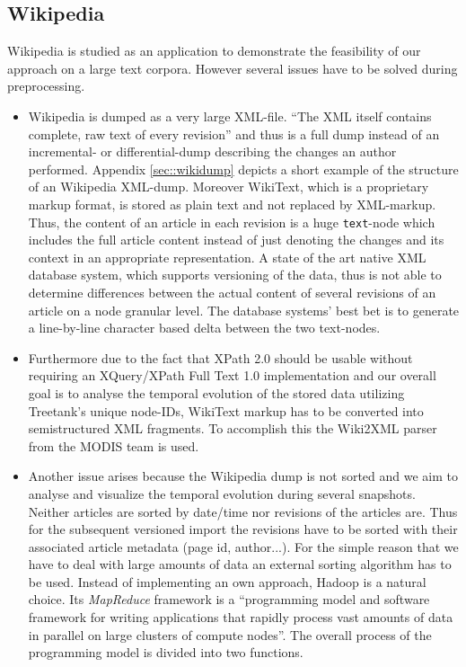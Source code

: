 \subsection{Wikipedia}
Wikipedia is studied as an application to demonstrate the feasibility of our approach on a large text corpora. However several issues have to be solved during preprocessing.

\begin{itemize}
\item Wikipedia is dumped as a very large XML-file. ``The XML itself contains complete, raw text of every revision''\cite{WikiDump} and thus is a full dump instead of an incremental- or differential-dump describing the changes an author performed. Appendix \ref{sec::wikidump} depicts a short example of the structure of an Wikipedia XML-dump. Moreover WikiText, which is a proprietary markup format, is stored as plain text and not replaced by XML-markup. Thus, the content of an article in each revision is a huge \texttt{text}-node which includes the full article content instead of just denoting the changes and its context in an appropriate representation. A state of the art native XML database system, which supports versioning of the data, thus is not able to determine differences between the actual content of several revisions of an article on a node granular level. The database systems' best bet is to generate a line-by-line character based delta between the two text-nodes.

\item Furthermore due to the fact that XPath 2.0 should be usable without requiring an XQuery/XPath Full Text 1.0 implementation and our overall goal is to analyse the temporal evolution of the stored data utilizing Treetank's unique node-IDs, WikiText markup has to be converted into semistructured XML fragments. To accomplish this the Wiki2XML parser from the MODIS team \cite{Wiki2XML} is used.

\item Another issue arises because the Wikipedia dump is not sorted and we aim to analyse and visualize the temporal evolution during several snapshots. Neither articles are sorted by date/time nor revisions of the articles are. Thus for the subsequent versioned import the revisions have to be sorted with their associated article metadata (page id, author...). For the simple reason that we have to deal with large amounts of data an external sorting algorithm has to be used. Instead of implementing an own approach, Hadoop is a natural choice. Its \emph{MapReduce}\cite{Hadoop} framework is a ``programming model and software framework for writing applications that rapidly process vast amounts of data in parallel on large clusters of compute nodes''. The overall process of the programming model is divided into two functions.
\end{itemize}

